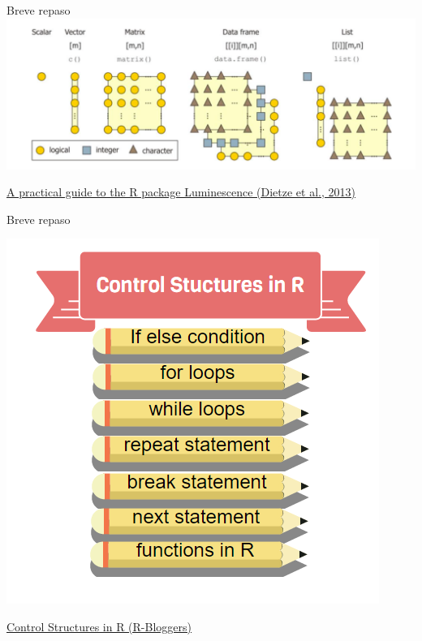 \documentclass[
  10pt,
  ignorenonframetext,
]{beamer}
\begin{document}
\begin{frame}{Breve repaso}
\protect\hypertarget{breve-repaso}{}
\includegraphics{../../imgs/r_tipos_datos.png}

\vspace{50pt}

\raggedleft \small \href{https://hal.archives-ouvertes.fr/hal-01846155/document}{A
practical guide to the R package Luminescence (Dietze et al., 2013)}
\end{frame}

\begin{frame}{Breve repaso}
\protect\hypertarget{breve-repaso-1}{}
\begin{center}\includegraphics[width=0.6\linewidth]{../../imgs/control_structures+in+R} \end{center}

\raggedleft \small \href{https://www.r-bloggers.com/control-structures-loops-in-r/}{Control
Structures in R (R-Bloggers)}
\end{frame}
\end{document}
